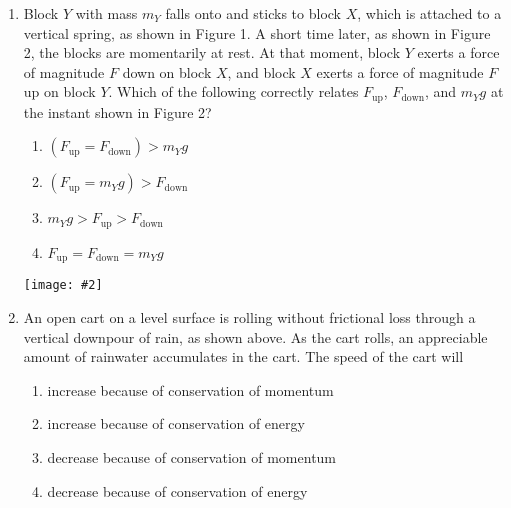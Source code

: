 \documentclass[11pt]{article}
\newcommand{\pic}[2]{\texttt{[image: \#2]}}
\begin{document}
\begin{multicols}{2}
\begin{enumerate}[leftmargin=18pt]
    \begin{center}
      \pic{.25}{falling-blocks}
    \end{center}
  \item Block $Y$ with mass $m_Y$ falls onto and sticks to block $X$, which is
    attached to a vertical spring, as shown in Figure 1. A short time later, as
    shown in Figure 2, the blocks are momentarily at rest. At that moment,
    block $Y$ exerts a force of magnitude $F$ down on block $X$, and block $X$
    exerts a force of magnitude $F$ up on block $Y$. Which of the following
    correctly relates $F_\text{up}$, $F_\text{down}$, and $m_Yg$ at the
    instant shown in Figure 2?
    \begin{enumerate}[nosep,leftmargin=18pt,label=(\Alph*)]
    \item$\left(F_\text{up}=F_\text{down}\right)>m_Yg$
    \item$\left(F_\text{up}=m_Yg\right)>F_\text{down}$
    \item$m_Yg > F_\text{up} > F_\text{down}$
    \item$F_\text{up}=F_\text{down}=m_Yg$
    \end{enumerate}
    \columnbreak
    
    \begin{center}
      \pic{.35}{downpour}
    \end{center}
  \item An open cart on a level surface is rolling without frictional loss
    through a vertical downpour of rain, as shown above. As the cart rolls,
    an appreciable amount of rainwater accumulates in the cart. The speed of
    the cart will
    \begin{enumerate}[nosep,leftmargin=18pt,label=(\Alph*)]
    \item increase because of conservation of momentum
    \item increase because of conservation of energy
    \item decrease because of conservation of momentum
    \item decrease because of conservation of energy
    \end{enumerate}
    \vspace{.7in}
    

\end{enumerate}
\end{multicols}
\end{document}
